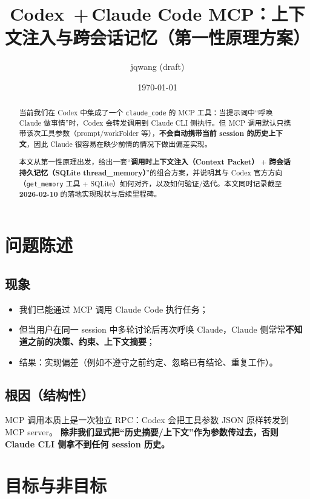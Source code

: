 \documentclass[UTF8,11pt]{ctexart}
\title{Codex \,+\,Claude Code MCP：上下文注入与跨会话记忆（第一性原理方案）}
\author{jqwang \quad (draft)}
\date{\today}
\begin{document}
\maketitle

\begin{abstract}
当前我们在 Codex 中集成了一个 \texttt{claude\_code} 的 MCP 工具：当提示词中“呼唤 Claude 做事情”时，Codex 会转发调用到 Claude CLI 侧执行。但 MCP 调用默认只携带该次工具参数（prompt/workFolder 等），\textbf{不会自动携带当前 session 的历史上下文}，因此 Claude 很容易在缺少前情的情况下做出偏差实现。

本文从第一性原理出发，给出一套“\textbf{调用时上下文注入（Context Packet）} + \textbf{跨会话持久记忆（SQLite thread\_memory）}”的组合方案，并说明其与 Codex 官方方向（\texttt{get\_memory} 工具 + SQLite）如何对齐，以及如何验证/迭代。本文同时记录截至 \textbf{2026-02-10} 的落地实现现状与后续里程碑。
\end{abstract}

\tableofcontents
\newpage

\section{问题陈述}
\subsection{现象}
\begin{itemize}[nosep]
  \item 我们已能通过 MCP 调用 Claude Code 执行任务；
  \item 但当用户在同一 session 中多轮讨论后再次呼唤 Claude，Claude 侧常常\textbf{不知道之前的决策、约束、上下文摘要}；
  \item 结果：实现偏差（例如不遵守之前约定、忽略已有结论、重复工作）。
\end{itemize}

\subsection{根因（结构性）}
MCP 调用本质上是一次独立 RPC：Codex 会把工具参数 JSON 原样转发到 MCP server。
\textbf{除非我们显式把“历史摘要/上下文”作为参数传过去，否则 Claude CLI 侧拿不到任何 session 历史。}

\section{目标与非目标}
\end{document}
